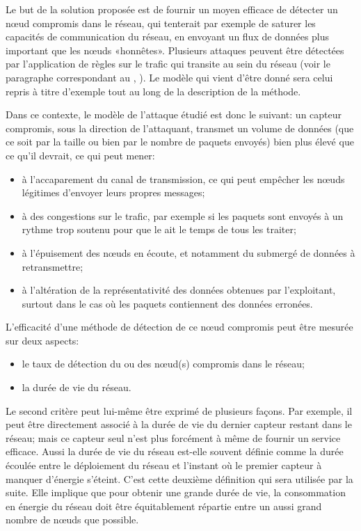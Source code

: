 Le but de la solution proposée est de fournir un moyen efficace de détecter un nœud compromis dans le réseau, qui tenterait par exemple de saturer les capacités de communication du réseau, en envoyant un flux de données plus important que les nœuds «honnêtes».
Plusieurs attaques peuvent être détectées par l'application de règles sur le trafic qui transite au sein du réseau (voir le paragraphe correspondant au , ).
Le modèle qui vient d'être donné sera celui repris à titre d'exemple tout au long de la description de la méthode.

Dans ce contexte, le modèle de l'attaque étudié est donc le suivant: un capteur compromis, sous la direction de l'attaquant, transmet un volume de données (que ce soit par la taille ou bien par le nombre de paquets envoyés) bien plus élevé que ce qu'il devrait, ce qui peut mener:
\begin{itemize}
    \item à l'accaparement du canal de transmission, ce qui peut empêcher les nœuds légitimes d'envoyer leurs propres messages;
    \item à des congestions sur le trafic, par exemple si les paquets sont envoyés à un rythme trop soutenu pour que le \CH ait le temps de tous les traiter;
    \item à l'épuisement des nœuds en écoute, et notamment du \ch submergé de données à retransmettre;
    \item à l'altération de la représentativité des données obtenues par l'exploitant, surtout dans le cas où les paquets contiennent des données erronées.
\end{itemize}

L'efficacité d'une méthode de détection de ce nœud compromis peut être mesurée sur deux aspects:
\begin{itemize}
    \item le taux de détection du ou des nœud(s) compromis dans le réseau;
    \item la durée de vie du réseau.
\end{itemize}
Le second critère peut lui-même être exprimé de plusieurs façons.
Par exemple, il peut être directement associé à la durée de vie du dernier capteur restant dans le réseau; mais ce capteur seul n'est plus forcément à même de fournir un service efficace.
Aussi la durée de vie du réseau est-elle souvent définie comme la durée écoulée entre le déploiement du réseau et l'instant où le premier capteur à manquer d'énergie s'éteint.
C'est cette deuxième définition qui sera utilisée par la suite.
Elle implique que pour obtenir une grande durée de vie, la consommation en énergie du réseau doit être équitablement répartie entre un aussi grand nombre de nœuds que possible.

